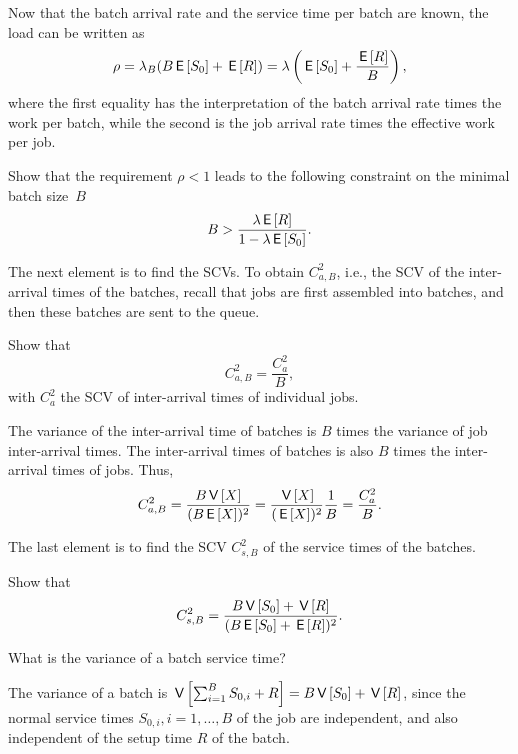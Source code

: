 Now that  the batch arrival rate and the service time per batch are known, the load can be written as
\begin{equation*}
\rho = \lambda_B (B \,\mathsf{E}\left[S_0\right] + \,\mathsf{E}\left[R\right]) = \lambda \left(\,\mathsf{E}\left[S_0\right] + \frac{\,\mathsf{E}\left[R\right]}B\right),
\end{equation*}
where the first equality has the interpretation of the batch arrival rate times the work per batch, while the second is the job arrival rate times the effective work per job. 

\begin{exercise}[\faFlask]
Show that the requirement $\rho < 1$ leads to the following constraint on the minimal batch size~$B$ 
  \begin{equation*}
 B>\frac{\lambda \,\mathsf{E}\left[R\right]}{1-\lambda \,\mathsf{E}\left[S_0\right]}.
  \end{equation*}
\end{exercise}

The next element is to find the SCVs. To obtain $C_{a,B}^2$, i.e., the SCV of the inter-arrival times of the batches, recall that jobs are first assembled into batches, and then these batches are sent to the queue.

\begin{exercise}[\faFlask]
 Show that 
 \begin{equation*}
C_{a,B}^2 = \frac{C_{a}^2}B,
 \end{equation*}
with $C_a^2$ the SCV of inter-arrival times of individual jobs.
  \begin{solution}
The variance of the inter-arrival time of batches is $B$ times the variance of job inter-arrival times. The inter-arrival times of batches is also $B$ times the inter-arrival times of jobs. Thus, 
\begin{equation*}
  C_{a,B}^2 = \frac{B \,\mathsf{V}\left[X\right]}{(B \,\mathsf{E}\left[X\right])^2} = \frac{\,\mathsf{V}\left[X\right]}{(\,\mathsf{E}\left[X\right])^2} \frac 1 B =  \frac{C_a^2}{B}.
\end{equation*}
  \end{solution}
\end{exercise}

The last element is to find the SCV $C_{s,B}^2$ of the service times of the batches.

\begin{exercise}[\faFlask]
Show that
\begin{equation*}
C_{s, B}^2 = \frac{B \,\mathsf{V}\left[S_0\right] + \,\mathsf{V}\left[R\right]}{(B \,\mathsf{E}\left[S_0\right] + \,\mathsf{E}\left[R\right])^2}.
\end{equation*}
\begin{hint}
  What is the variance of a batch service time?
\end{hint}
\begin{solution}
  The variance of a batch is $\,\mathsf{V}\left[\sum_{i=1}^B S_{0,i} + R\right] = B\,\mathsf{V}\left[S_0\right] + \,\mathsf{V}\left[R\right]$, since the normal service times $S_{0,i}, i=1,\ldots, B$ of the job are independent, and also independent of the setup time $R$  of the batch.
\end{solution}
\end{exercise}



